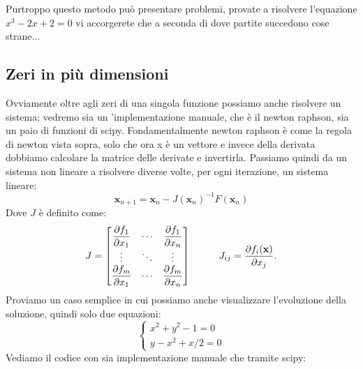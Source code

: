 \documentclass[10pt,a4paper]{article}
\begin{document}
Purtroppo questo metodo può presentare problemi, provate a risolvere l'equazione $x^3 - 2x + 2 = 0$ vi accorgerete che a seconda di dove partite succedono cose strane...

\subsection{Zeri in più dimensioni}
Ovviamente oltre agli zeri di una singola funzione possiamo anche risolvere un sistema; vedremo sia un 'implementazione manuale, che è il newton raphson, sia un paio di funzioni di scipy. Fondamentalmente newton raphson è come la regola di newton vista sopra, solo che ora x è un vettore e invece della derivata dobbiamo calcolare la matrice delle derivate e invertirla. Passiamo quindi da un sistema non lineare a risolvere diverse volte, per ogni iterazione, un sistema lineare:
\[
\textbf{x}_{n+1} = \textbf{x}_n - J(\textbf{x}_n)^{-1}F(\textbf{x}_n)
\]
Dove $J$ è definito come:
\[
J = \begin{bmatrix} \dfrac{\partial f_1}{\partial x_1} & \cdots & \dfrac{\partial f_1}{\partial x_n} \\ \vdots & \ddots & \vdots \\ \dfrac{\partial f_m}{\partial x_1} & \cdots & \dfrac{\partial f_m}{\partial x_n}  \end{bmatrix} \hspace{10 mm} J_{ij} = \frac{\partial f_i (\mathbf {x})}{\partial x_j}.
\]
Proviamo un caso semplice in cui possiamo anche visualizzare l'evoluzione della soluzione, quindi solo due equazioni:
\[
\begin{cases}
x^2 + y^2 - 1 = 0 \\
y - x^2 + x/2 = 0
\end{cases}
\]
Vediamo il codice con sia implementazione manuale che tramite scipy:
\end{document}

